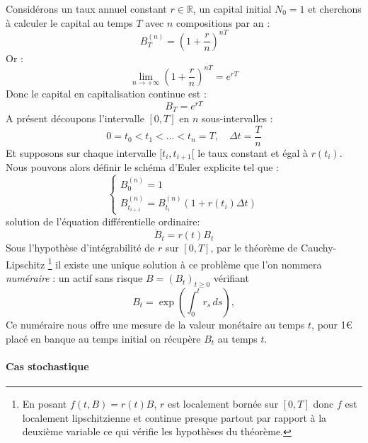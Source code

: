 Considérons un taux annuel constant $r \in \mathbb{R}$, un capital initial $N_0 = 1$ et
cherchons à calculer le capital au temps $T$ avec $n$ compositions par an :
\begin{equation}
    B_T^{(n)} = \left ( 1 + \frac{r}{n} \right )^{nT}
\end{equation}
Or :
\begin{equation}
    \lim_{n \to +\infty} \left ( 1 + \frac{r}{n} \right )^{nT} = e^{rT}
\end{equation}
Donc le capital en capitalisation continue est :
\begin{equation}
    B_T = e^{rT}
\end{equation}
A présent découpons l'intervalle $[0, T]$ en $n$ sous-intervalles :
\begin{equation}
    0 = t_0 < t_1 < ... < t_n = T, \quad \Delta t = \frac{T}{n}
\end{equation}
Et supposons sur chaque intervalle $[t_i, t_{i+1}[$ le taux constant et égal à $r(t_i)$.
Nous pouvons alors définir le schéma d'Euler explicite tel que :
\begin{equation}
    \begin{cases}
        B_0^{(n)} = 1 \\
        B_{t_{i+1}}^{(n)} = B_{t_{i}}^{(n)} \left (1 + r(t_{i}) \Delta t \right )
    \end{cases}
\end{equation}
solution de l'équation différentielle ordinaire:
\begin{equation}
    \dot{B}_t = r(t) B_t
\end{equation}
Sous l'hypothèse d'intégrabilité de $r$ sur $[0, T]$, par le théorème de Cauchy-Lipschitz 
\footnote{En posant $f(t,B)=r(t)B$, $r$ est localement bornée sur $[0, T]$ donc $f$ est
localement lipschitzienne et continue presque partout par rapport à la deuxième variable ce qui vérifie les
hypothèses du théorème.} il existe une unique solution à
ce problème que l'on nommera \emph{numéraire} : un actif sans risque $B=(B_t)_{t\ge 0}$
vérifiant
\begin{equation}
    B_t = \exp\!\left(\int_0^t r_s \, ds\right),
    \label{rates_formula}
\end{equation}
Ce numéraire nous offre une mesure de la valeur monétaire au temps $t$,
pour 1€ placé en banque au temps initial on récupère $B_t$ au temps $t$.

\paragraph{Cas stochastique}

